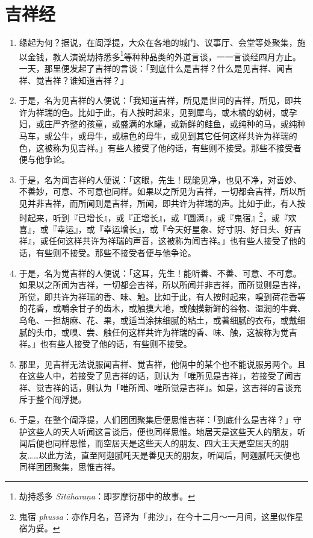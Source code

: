 \section{吉祥经}

\begin{enumerate}\item 缘起为何？据说，在阎浮提，大众在各地的城门、议事厅、会堂等处聚集，施以金钱，教人演说劫持悉多\footnote{劫持悉多 \textit{Sītāharaṇa}：即罗摩衍那中的故事。}等种种品类的外道言谈，一一言谈经四月方止。一天，那里便发起了吉祥的言谈：「到底什么是吉祥？什么是见吉祥、闻吉祥、觉吉祥？谁知道吉祥？」
\item 于是，名为见吉祥的人便说：「我知道吉祥，所见是世间的吉祥，所见，即共许为祥瑞的色。比如于此，有人按时起来，见到犀鸟，或木橘的幼树，或孕妇，或庄严齐整的孩童，或盛满的水罐，或新鲜的鲑鱼，或纯种的马，或纯种马车，或公牛，或母牛，或棕色的母牛，或见到其它任何这样共许为祥瑞的色，这被称为见吉祥。」有些人接受了他的话，有些则不接受。那些不接受者便与他争论。
\item 于是，名为闻吉祥的人便说：「这眼，先生！既能见净，也见不净，对善妙、不善妙，可意、不可意也同样。如果以之所见为吉祥，一切都会吉祥，所以所见并非吉祥，而所闻则是吉祥，所闻，即共许为祥瑞的声。比如于此，有人按时起来，听到『已增长』，或『正增长』，或『圆满』，或『鬼宿』\footnote{鬼宿 \textit{phussa}：亦作月名，音译为「弗沙」，在今十二月～一月间，这里似作星宿为妥。}，或『欢喜』，或『幸运』，或『幸运增长』，或『今天好星象、好寸阴、好日头、好吉祥』，或任何这样共许为祥瑞的声音，这被称为闻吉祥。」也有些人接受了他的话，有些则不接受。那些不接受者便与他争论。
\item 于是，名为觉吉祥的人便说：「这耳，先生！能听善、不善、可意、不可意。如果以之所闻为吉祥，一切都会吉祥，所以所闻并非吉祥，而所觉则是吉祥，所觉，即共许为祥瑞的香、味、触。比如于此，有人按时起来，嗅到荷花香等的花香，或嚼余甘子的齿木，或触摸大地，或触摸新鲜的谷物、湿润的牛粪、乌龟、一担胡麻、花、果，或适当涂抹细腻的粘土，或著细腻的衣布，或戴细腻的头巾，或嗅、尝、触任何这样共许为祥瑞的香、味、触，这被称为觉吉祥。」也有些人接受了他的话，有些则不接受。
\item 那里，见吉祥无法说服闻吉祥、觉吉祥，他俩中的某个也不能说服另两个。且在这些人中，若接受了见吉祥的话，则认为「唯所见是吉祥」，若接受了闻吉祥、觉吉祥的话，则认为「唯所闻、唯所觉是吉祥」。如是，这吉祥的言谈充斥于整个阎浮提。
\item 于是，在整个阎浮提，人们团团聚集后便思惟吉祥：「到底什么是吉祥？」守护这些人的天人听闻这言谈后，便也同样思惟。地居天是这些天人的朋友，听闻后便也同样思惟，而空居天是这些天人的朋友、四大王天是空居天的朋友……以此方法，直至阿迦腻吒天是善见天的朋友，听闻后，阿迦腻吒天便也同样团团聚集，思惟吉祥。

\end{enumerate}
